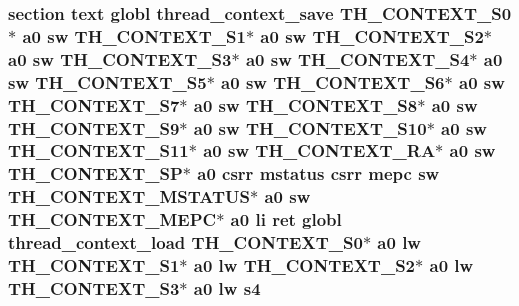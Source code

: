 \hypertarget{riscv_2threada_8S_afad8c7fc1027bc1516357137ee701e9f}{
\subsubsection[{s4}]{\setlength{\rightskip}{0pt plus 5cm}section text globl {\bf thread\-\_\-context\-\_\-save} {\bf T\-H\-\_\-\-C\-O\-N\-T\-E\-X\-T\-\_\-\-S0}$\ast$ {\bf a0} {\bf sw} {\bf T\-H\-\_\-\-C\-O\-N\-T\-E\-X\-T\-\_\-\-S1}$\ast$ {\bf a0} {\bf sw} {\bf T\-H\-\_\-\-C\-O\-N\-T\-E\-X\-T\-\_\-\-S2}$\ast$ {\bf a0} {\bf sw} {\bf T\-H\-\_\-\-C\-O\-N\-T\-E\-X\-T\-\_\-\-S3}$\ast$ {\bf a0} {\bf sw} {\bf T\-H\-\_\-\-C\-O\-N\-T\-E\-X\-T\-\_\-\-S4}$\ast$ {\bf a0} {\bf sw} {\bf T\-H\-\_\-\-C\-O\-N\-T\-E\-X\-T\-\_\-\-S5}$\ast$ {\bf a0} {\bf sw} {\bf T\-H\-\_\-\-C\-O\-N\-T\-E\-X\-T\-\_\-\-S6}$\ast$ {\bf a0} {\bf sw} {\bf T\-H\-\_\-\-C\-O\-N\-T\-E\-X\-T\-\_\-\-S7}$\ast$ {\bf a0} {\bf sw} {\bf T\-H\-\_\-\-C\-O\-N\-T\-E\-X\-T\-\_\-\-S8}$\ast$ {\bf a0} {\bf sw} {\bf T\-H\-\_\-\-C\-O\-N\-T\-E\-X\-T\-\_\-\-S9}$\ast$ {\bf a0} {\bf sw} {\bf T\-H\-\_\-\-C\-O\-N\-T\-E\-X\-T\-\_\-\-S10}$\ast$ {\bf a0} {\bf sw} {\bf T\-H\-\_\-\-C\-O\-N\-T\-E\-X\-T\-\_\-\-S11}$\ast$ {\bf a0} {\bf sw} {\bf T\-H\-\_\-\-C\-O\-N\-T\-E\-X\-T\-\_\-\-R\-A}$\ast$ {\bf a0} {\bf sw} {\bf T\-H\-\_\-\-C\-O\-N\-T\-E\-X\-T\-\_\-\-S\-P}$\ast$ {\bf a0} csrr {\bf mstatus} csrr {\bf mepc} {\bf sw} {\bf T\-H\-\_\-\-C\-O\-N\-T\-E\-X\-T\-\_\-\-M\-S\-T\-A\-T\-U\-S}$\ast$ {\bf a0} {\bf sw} {\bf T\-H\-\_\-\-C\-O\-N\-T\-E\-X\-T\-\_\-\-M\-E\-P\-C}$\ast$ {\bf a0} {\bf li} ret globl {\bf thread\-\_\-context\-\_\-load} {\bf T\-H\-\_\-\-C\-O\-N\-T\-E\-X\-T\-\_\-\-S0}$\ast$ {\bf a0} {\bf lw} {\bf T\-H\-\_\-\-C\-O\-N\-T\-E\-X\-T\-\_\-\-S1}$\ast$ {\bf a0} {\bf lw} {\bf T\-H\-\_\-\-C\-O\-N\-T\-E\-X\-T\-\_\-\-S2}$\ast$ {\bf a0} {\bf lw} {\bf T\-H\-\_\-\-C\-O\-N\-T\-E\-X\-T\-\_\-\-S3}$\ast$ {\bf a0} {\bf lw} s4}}\label{riscv_2threada_8S_afad8c7fc1027bc1516357137ee701e9f}
